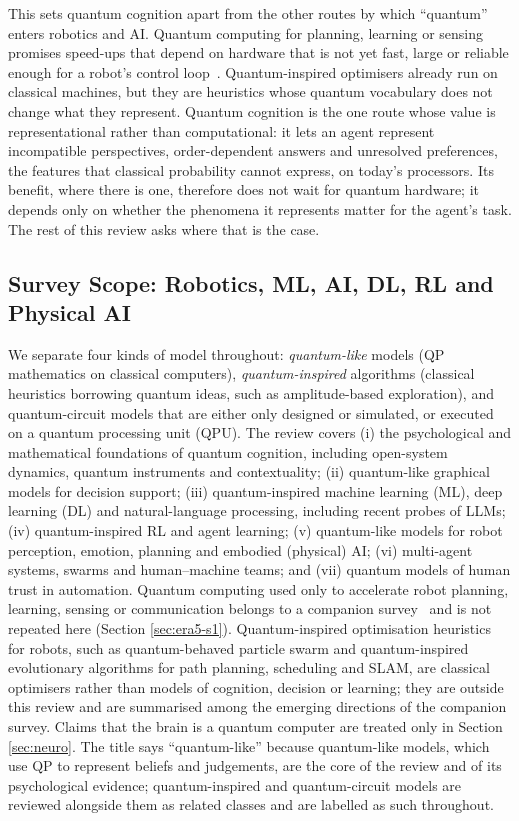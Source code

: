 \documentclass[pdflatex,sn-basic]{sn-jnl}
\begin{document}
This sets quantum cognition apart from the other routes by which ``quantum'' enters robotics and AI. Quantum computing for planning, learning or sensing promises speed-ups that depend on hardware that is not yet fast, large or reliable enough for a robot's control loop~\citep{Preskill2018,Guru2026}. Quantum-inspired optimisers already run on classical machines, but they are heuristics whose quantum vocabulary does not change what they represent. Quantum cognition is the one route whose value is representational rather than computational: it lets an agent represent incompatible perspectives, order-dependent answers and unresolved preferences, the features that classical probability cannot express, on today's processors. Its benefit, where there is one, therefore does not wait for quantum hardware; it depends only on whether the phenomena it represents matter for the agent's task. The rest of this review asks where that is the case.


\subsection{Survey Scope: Robotics, ML, AI, DL, RL and Physical AI}\label{sec:scope}
We separate four kinds of model throughout: \emph{quantum-like} models (QP mathematics on classical computers), \emph{quantum-inspired} algorithms (classical heuristics borrowing quantum ideas, such as amplitude-based exploration), and quantum-circuit models that are either only designed or simulated, or executed on a quantum processing unit (QPU). The review covers (i) the psychological and mathematical foundations of quantum cognition, including open-system dynamics, quantum instruments and contextuality; (ii) quantum-like graphical models for decision support; (iii) quantum-inspired machine learning (ML), deep learning (DL) and natural-language processing, including recent probes of LLMs; (iv) quantum-inspired RL and agent learning; (v) quantum-like models for robot perception, emotion, planning and embodied (physical) AI; (vi) multi-agent systems, swarms and human--machine teams; and (vii) quantum models of human trust in automation. Quantum computing used only to accelerate robot planning, learning, sensing or communication belongs to a companion survey~\citep{Guru2026} and is not repeated here (Section \ref{sec:era5-s1}). Quantum-inspired optimisation heuristics for robots, such as quantum-behaved particle swarm and quantum-inspired evolutionary algorithms for path planning, scheduling and SLAM, are classical optimisers rather than models of cognition, decision or learning; they are outside this review and are summarised among the emerging directions of the companion survey. Claims that the brain is a quantum computer are treated only in Section \ref{sec:neuro}. The title says ``quantum-like'' because quantum-like models, which use QP to represent beliefs and judgements, are the core of the review and of its psychological evidence; quantum-inspired and quantum-circuit models are reviewed alongside them as related classes and are labelled as such throughout.
\end{document}
